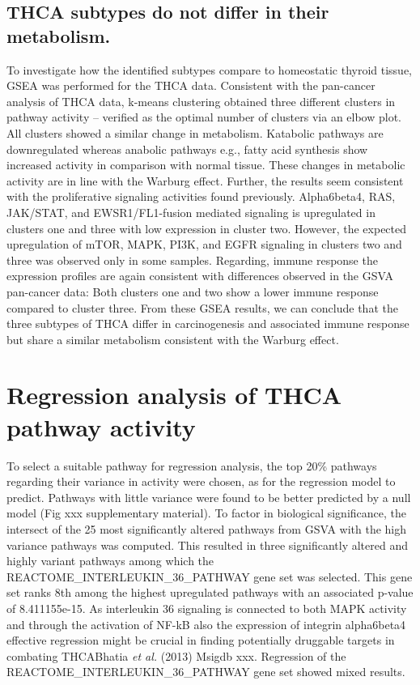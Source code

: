 \documentclass[
  parskip,
  oneside]{scrreprt}
\begin{document}
\hypertarget{thca-subtypes-do-not-differ-in-their-metabolism.}{%
\subsection{THCA subtypes do not differ in their
metabolism.}\label{thca-subtypes-do-not-differ-in-their-metabolism.}}

To investigate how the identified subtypes compare to homeostatic
thyroid tissue, GSEA was performed for the THCA data. Consistent with
the pan-cancer analysis of THCA data, k-means clustering obtained three
different clusters in pathway activity -- verified as the optimal number
of clusters via an elbow plot. All clusters showed a similar change in
metabolism. Katabolic pathways are downregulated whereas anabolic
pathways e.g., fatty acid synthesis show increased activity in
comparison with normal tissue. These changes in metabolic activity are
in line with the Warburg effect. Further, the results seem consistent
with the proliferative signaling activities found previously.
Alpha6beta4, RAS, JAK/STAT, and EWSR1/FL1-fusion mediated signaling is
upregulated in clusters one and three with low expression in cluster
two. However, the expected upregulation of mTOR, MAPK, PI3K, and EGFR
signaling in clusters two and three was observed only in some samples.
Regarding, immune response the expression profiles are again consistent
with differences observed in the GSVA pan-cancer data: Both clusters one
and two show a lower immune response compared to cluster three. From
these GSEA results, we can conclude that the three subtypes of THCA
differ in carcinogenesis and associated immune response but share a
similar metabolism consistent with the Warburg effect.

\hypertarget{regression-analysis-of-thca-pathway-activity}{%
\section{Regression analysis of THCA pathway
activity}\label{regression-analysis-of-thca-pathway-activity}}

To select a suitable pathway for regression analysis, the top 20\%
pathways regarding their variance in activity were chosen, as for the
regression model to predict. Pathways with little variance were found to
be better predicted by a null model (Fig xxx supplementary material). To
factor in biological significance, the intersect of the 25 most
significantly altered pathways from GSVA with the high variance pathways
was computed. This resulted in three significantly altered and highly
variant pathways among which the REACTOME\_INTERLEUKIN\_36\_PATHWAY gene
set was selected. This gene set ranks 8th among the highest upregulated
pathways with an associated p-value of 8.411155e-15. As interleukin 36
signaling is connected to both MAPK activity and through the activation
of NF-kB also the expression of integrin alpha6beta4 effective
regression might be crucial in finding potentially druggable targets in
combating THCABhatia \emph{et al.} (2013) Msigdb xxx. Regression of the
REACTOME\_INTERLEUKIN\_36\_PATHWAY gene set showed mixed results.
\end{document}
